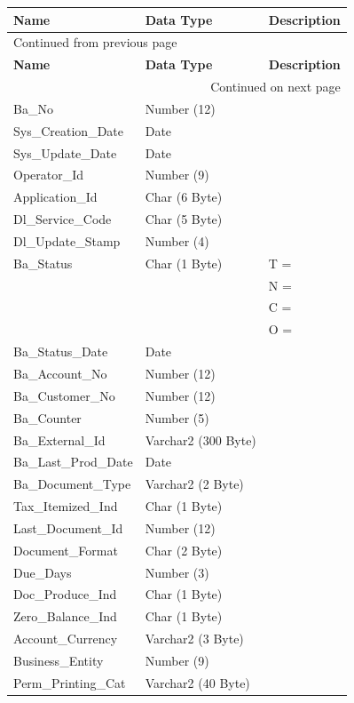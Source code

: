 \documentclass[12pt,twoside]{article}
\begin{document}
\footnotesize
\begin{longtable}{l|l|l}
\hline
\textbf{Name} & \textbf{Data Type} & \textbf{Description}\\
\hline
\endfirsthead
\multicolumn{3}{l}{Continued from previous page} \\
\hline

\textbf{Name} & \textbf{Data Type} & \textbf{Description} \\

\hline
\endhead
\hline\multicolumn{3}{r}{Continued on next page} \\
\endfoot
\endlastfoot
\hline
Ba\_No & Number (12) & \\
Sys\_Creation\_Date & Date & \\
Sys\_Update\_Date & Date & \\
Operator\_Id & Number (9) & \\
Application\_Id & Char (6 Byte) & \\
Dl\_Service\_Code & Char (5 Byte) & \\
Dl\_Update\_Stamp & Number (4) & \\
Ba\_Status & Char (1 Byte) & T =\\
&  & N =\\
&  & C =\\
&  & O =\\
Ba\_Status\_Date & Date & \\
Ba\_Account\_No & Number (12) & \\
Ba\_Customer\_No & Number (12) & \\
Ba\_Counter & Number (5) & \\
Ba\_External\_Id & Varchar2 (300 Byte) & \\
Ba\_Last\_Prod\_Date & Date & \\
Ba\_Document\_Type & Varchar2 (2 Byte) & \\
Tax\_Itemized\_Ind & Char (1 Byte) & \\
Last\_Document\_Id & Number (12) & \\
Document\_Format & Char (2 Byte) & \\
Due\_Days & Number (3) & \\
Doc\_Produce\_Ind & Char (1 Byte) & \\
Zero\_Balance\_Ind & Char (1 Byte) & \\
Account\_Currency & Varchar2 (3 Byte) & \\
Business\_Entity & Number (9) & \\
Perm\_Printing\_Cat & Varchar2 (40 Byte) & \\

\end{longtable}
\end{document}
